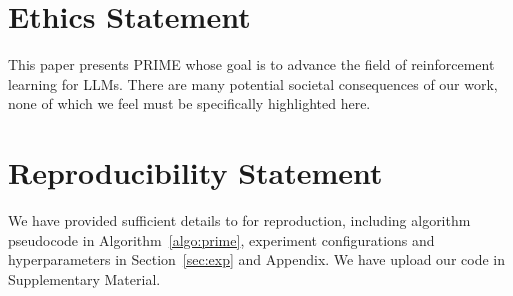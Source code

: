 \documentclass{article} %
\begin{document}
\newpage
\section*{Ethics Statement}
This paper presents PRIME whose goal is to advance the field of reinforcement learning for LLMs. There are many potential societal consequences of our work, none of which we feel must be specifically highlighted here.

\section*{Reproducibility Statement}
We have provided sufficient details to for reproduction, including algorithm pseudocode in Algorithm~\ref{algo:prime}, experiment configurations and hyperparameters in Section~\ref{sec:exp} and Appendix. We have upload our code in Supplementary Material.








\appendix



\end{document}
